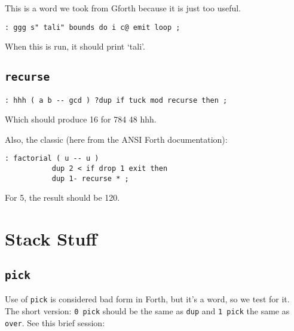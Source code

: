 This is a word we took from Gforth because it is just too useful.

\begin{lstlisting}[frame=lines]
        : ggg s" tali" bounds do i c@ emit loop ;
\end{lstlisting}

\noindent When this is run, it should print `tali'.



\subsection{\texttt{recurse}}

\begin{lstlisting}[frame=lines]
        : hhh ( a b -- gcd ) ?dup if tuck mod recurse then ;
\end{lstlisting}

\noindent Which should produce 16 for 784 48 hhh. 


Also, the classic (here from the ANSI Forth documentation):

\begin{lstlisting}[frame=lines]
        : factorial ( u -- u ) 
           dup 2 < if drop 1 exit then 
           dup 1- recurse * ;
\end{lstlisting}

\noindent For 5, the result should be 120.


\section{Stack Stuff}

\subsection{\texttt{pick}}

Use of \texttt{pick} is considered bad form in Forth, but it's a word, so we
test for it. The short version: \texttt{0 pick} should be the same as
\texttt{dup} and \texttt{1 pick} the same as
\texttt{over}. See this brief session:

